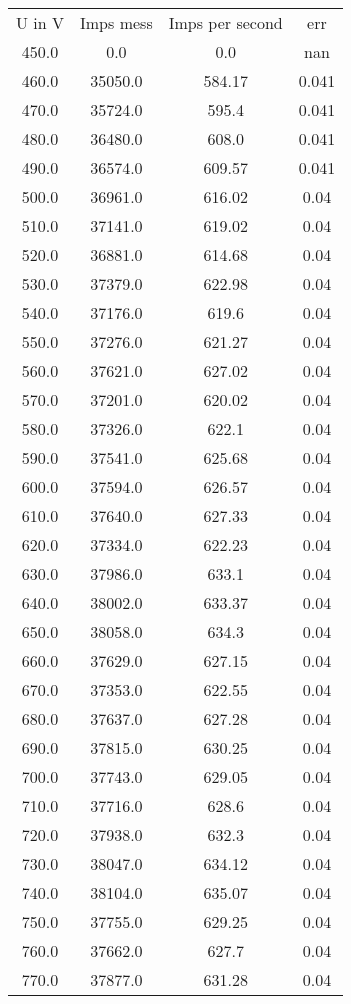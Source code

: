 \begin{table}
\begin{tabular}{cccc}
U in V & Imps mess & Imps per second & err \\
450.0 & 0.0 & 0.0 & nan \\
460.0 & 35050.0 & 584.17 & 0.041 \\
470.0 & 35724.0 & 595.4 & 0.041 \\
480.0 & 36480.0 & 608.0 & 0.041 \\
490.0 & 36574.0 & 609.57 & 0.041 \\
500.0 & 36961.0 & 616.02 & 0.04 \\
510.0 & 37141.0 & 619.02 & 0.04 \\
520.0 & 36881.0 & 614.68 & 0.04 \\
530.0 & 37379.0 & 622.98 & 0.04 \\
540.0 & 37176.0 & 619.6 & 0.04 \\
550.0 & 37276.0 & 621.27 & 0.04 \\
560.0 & 37621.0 & 627.02 & 0.04 \\
570.0 & 37201.0 & 620.02 & 0.04 \\
580.0 & 37326.0 & 622.1 & 0.04 \\
590.0 & 37541.0 & 625.68 & 0.04 \\
600.0 & 37594.0 & 626.57 & 0.04 \\
610.0 & 37640.0 & 627.33 & 0.04 \\
620.0 & 37334.0 & 622.23 & 0.04 \\
630.0 & 37986.0 & 633.1 & 0.04 \\
640.0 & 38002.0 & 633.37 & 0.04 \\
650.0 & 38058.0 & 634.3 & 0.04 \\
660.0 & 37629.0 & 627.15 & 0.04 \\
670.0 & 37353.0 & 622.55 & 0.04 \\
680.0 & 37637.0 & 627.28 & 0.04 \\
690.0 & 37815.0 & 630.25 & 0.04 \\
700.0 & 37743.0 & 629.05 & 0.04 \\
710.0 & 37716.0 & 628.6 & 0.04 \\
720.0 & 37938.0 & 632.3 & 0.04 \\
730.0 & 38047.0 & 634.12 & 0.04 \\
740.0 & 38104.0 & 635.07 & 0.04 \\
750.0 & 37755.0 & 629.25 & 0.04 \\
760.0 & 37662.0 & 627.7 & 0.04 \\
770.0 & 37877.0 & 631.28 & 0.04 \\

\end{tabular}
\end{table}
